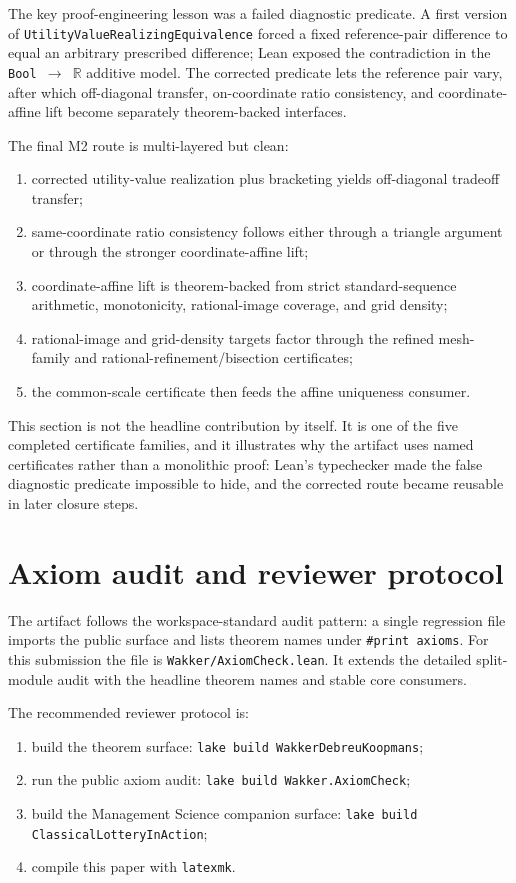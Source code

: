 \documentclass[11pt,english]{article}
\begin{document}
The key proof-engineering lesson was a failed diagnostic predicate.  A first version of \texttt{UtilityValueRealizingEquivalence} forced a fixed reference-pair difference to equal an arbitrary prescribed difference; Lean exposed the contradiction in the \texttt{Bool \(\to\) \(\mathbb{R}\)} additive model.  The corrected predicate lets the reference pair vary, after which off-diagonal transfer, on-coordinate ratio consistency, and coordinate-affine lift become separately theorem-backed interfaces.

The final M2 route is multi-layered but clean:
\begin{enumerate}[leftmargin=*]
\item corrected utility-value realization plus bracketing yields off-diagonal tradeoff transfer;
\item same-coordinate ratio consistency follows either through a triangle argument or through the stronger coordinate-affine lift;
\item coordinate-affine lift is theorem-backed from strict standard-sequence arithmetic, monotonicity, rational-image coverage, and grid density;
\item rational-image and grid-density targets factor through the refined mesh-family and rational-refinement/bisection certificates;
\item the common-scale certificate then feeds the affine uniqueness consumer.
\end{enumerate}

This section is not the headline contribution by itself.  It is one of the five completed certificate families, and it illustrates why the artifact uses named certificates rather than a monolithic proof: Lean's typechecker made the false diagnostic predicate impossible to hide, and the corrected route became reusable in later closure steps.

\section{Axiom audit and reviewer protocol}
\label{sec:audit}

The artifact follows the workspace-standard audit pattern: a single regression file imports the public surface and lists theorem names under \texttt{\#print axioms}.  For this submission the file is \texttt{Wakker/AxiomCheck.lean}.  It extends the detailed split-module audit with the headline theorem names and stable core consumers.

The recommended reviewer protocol is:
\begin{enumerate}[leftmargin=*]
\item build the theorem surface: \texttt{lake build WakkerDebreuKoopmans};
\item run the public axiom audit: \texttt{lake build Wakker.AxiomCheck};
\item build the Management Science companion surface: \texttt{lake build ClassicalLotteryInAction};
\item compile this paper with \texttt{latexmk}.
\end{enumerate}
\end{document}
